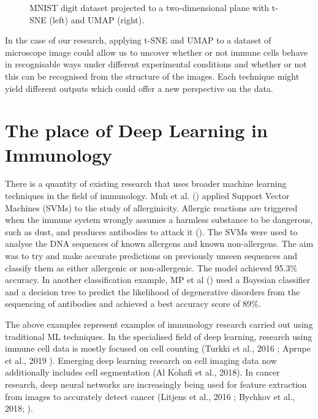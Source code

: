 \begin{figure}
    \centering
    \caption{MNIST digit dataset projected to a two-dimensional plane with t-SNE (left) and UMAP (right).}
    \label{fig:vis_mnist}
\end{figure}

In the case of our research, applying t-SNE and UMAP to a dataset of microscope image could allow us to uncover whether or not immune cells behave in recognisable ways under different experimental conditions and whether or not this can be recognised from the structure of the images. Each technique might yield different outputs which could offer a new perspective on the data.

\section{The place of Deep Learning in Immunology}

There is a quantity of existing research that uses broader machine learning techniques in the field of immunology. Muh et al. (\cite{https://www.ncbi.nlm.nih.gov/pubmed/19516900/}) applied Support Vector Machines (SVMs) to the study of allerginicity. Allergic reactions are triggered when the immune system wrongly assumes a harmless substance to be dangerous, such as dust, and produces antibodies to attack it  (\cite{https://www.immunology.org/policy-and-public-affairs/briefings-and-position-statements/allergy}). The SVMs were used to analyse the DNA sequences of known allergens and known non-allergens. The aim was to try and make accurate predictions on previously unseen sequences and classify them as either allergenic or non-allergenic. The model achieved 95.3\% accuracy.  In another classification example, MP et al (\cite{https://www.ncbi.nlm.nih.gov/pubmed/20144194/}) used a Bayesian classifier and a decision tree to predict the likelihood of degenerative disorders from the sequencing of antibodies and achieved a best accuracy score of 89\%.

The above examples represent examples of immunology research carried out using traditional ML techniques. In the specialised field of deep learning, research using immune cell data is mostly focused on cell counting (Turkki et al., 2016 \cite{https://www.ncbi.nlm.nih.gov/pmc/articles/PMC5027738/}; Aprupe et al., 2019 \cite{https://www.ncbi.nlm.nih.gov/pmc/articles/PMC6462181/}). Emerging deep learning research on cell imaging data now additionally includes cell segmentation (Al Kohafi et al., 2018). In cancer research, deep neural networks are increasingly being used for feature extraction from images to accurately detect cancer (Litjens et al., 2016 \cite{https://www.ncbi.nlm.nih.gov/pmc/articles/PMC4876324/}; Bychkov et al., 2018; \cite{https://www.ncbi.nlm.nih.gov/pmc/articles/PMC5821847/}).

